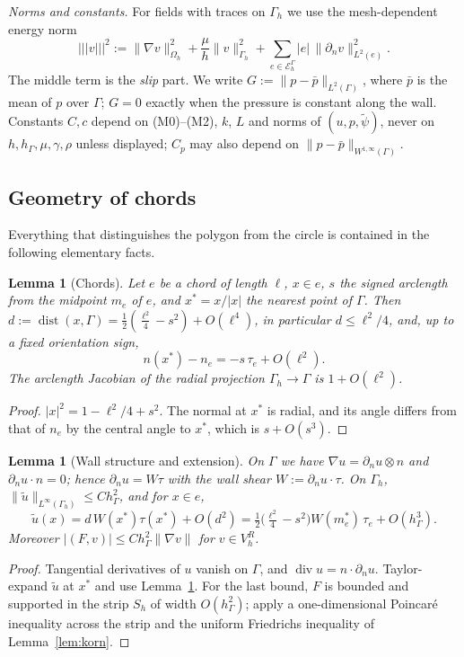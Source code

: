 \documentclass[pdflatex,sn-mathphys-num]{sn-jnl}
\theoremstyle{thmstyleone}
\newtheorem{lemma}[theorem]{Lemma}
\theoremstyle{thmstylethree}
\newcommand{\hG}{h_\Gamma}
\newcommand{\Gh}{\Gamma_h}
\newcommand{\Oh}{\Omega_h}
\newcommand{\EG}{\mathcal E_h^\Gamma}
\newcommand{\VR}{V_h^R}
\newcommand{\dn}{\partial_n}
\newcommand{\ut}{\tilde u}
\newcommand{\psit}{\tilde\psi}
\newcommand{\pbar}{\bar p}
\newcommand{\tnorm}[1]{|\!|\!|#1|\!|\!|}
\newcommand{\norm}[1]{\lVert #1\rVert}
\renewcommand{\div}{\operatorname{div}}
\DeclareMathOperator{\dist}{dist}
\begin{document}
\emph{Norms and constants.} For fields with traces on $\Gh$ we use the mesh-dependent energy norm
\[
\tnorm{v}^2:=\norm{\nabla v}_{\Oh}^2+\frac{\mu}{h}\norm{v}_{\Gh}^2+\sum_{e\in\EG}|e|\,\norm{\dn v}_{L^2(e)}^2 .
\]
The middle term is the \emph{slip} part. We write $G:=\norm{p-\pbar}_{L^2(\Gamma)}$, where $\pbar$ is the mean of $p$ over $\Gamma$; $G=0$ exactly when the pressure is constant along the wall. Constants $C,c$ depend on (M0)--(M2), $k$, $L$ and norms of $(u,p,\psit)$, never on $h,\hG,\mu,\gamma,\rho$ unless displayed; $C_p$ may also depend on $\norm{p-\pbar}_{W^{1,\infty}(\Gamma)}$.

\subsection{Geometry of chords}
Everything that distinguishes the polygon from the circle is contained in the following elementary facts.

\begin{lemma}[Chords]\label{lem:chords}
Let $e$ be a chord of length $\ell$, $x\in e$, $s$ the signed arclength from the midpoint $m_e$ of $e$, and $x^\ast=x/|x|$ the nearest point of $\Gamma$. Then $d:=\dist(x,\Gamma)=\frac12(\frac{\ell^2}4-s^2)+O(\ell^4)$, in particular $d\le\ell^2/4$, and, up to a fixed orientation sign,
\[
n(x^\ast)-n_e=-s\,\tau_e+O(\ell^2).
\]
The arclength Jacobian of the radial projection $\Gh\to\Gamma$ is $1+O(\ell^2)$.
\end{lemma}

\begin{proof}
$|x|^2=1-\ell^2/4+s^2$. The normal at $x^\ast$ is radial, and its angle differs from that of $n_e$ by the central angle to $x^\ast$, which is $s+O(s^3)$.
\end{proof}

\begin{lemma}[Wall structure and extension]\label{lem:wall}
On $\Gamma$ we have $\nabla u=\dn u\otimes n$ and $\dn u\cdot n=0$; hence $\dn u=W\tau$ with the \emph{wall shear} $W:=\dn u\cdot\tau$. On $\Gh$, $\norm{\ut}_{L^\infty(\Gh)}\le C\hG^2$, and for $x\in e$,
\begin{equation}\label{eq:bump}
\ut(x)=d\,W(x^\ast)\tau(x^\ast)+O(d^2)=\tfrac12\bigl(\tfrac{\ell^2}4-s^2\bigr)W(m_e^\ast)\,\tau_e+O(\hG^3).
\end{equation}
Moreover $|(F,v)|\le C\hG^2\norm{\nabla v}$ for $v\in\VR$.
\end{lemma}

\begin{proof}
Tangential derivatives of $u$ vanish on $\Gamma$, and $\div u=n\cdot\dn u$. Taylor-expand $\ut$ at $x^\ast$ and use Lemma~\ref{lem:chords}. For the last bound, $F$ is bounded and supported in the strip $S_h$ of width $O(\hG^2)$; apply a one-dimensional Poincar\'e inequality across the strip and the uniform Friedrichs inequality of Lemma~\ref{lem:korn}.
\end{proof}
\end{document}
